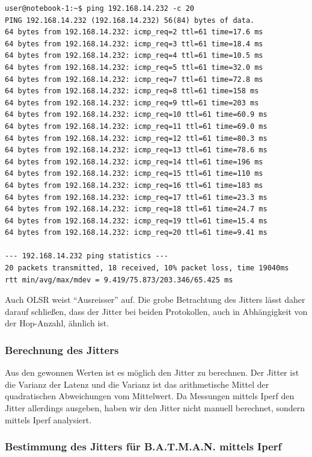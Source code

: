 \documentclass[a4paper,10pt]{article}
\begin{document}
\begin{lstlisting}
user@notebook-1:~$ ping 192.168.14.232 -c 20
PING 192.168.14.232 (192.168.14.232) 56(84) bytes of data.
64 bytes from 192.168.14.232: icmp_req=2 ttl=61 time=17.6 ms
64 bytes from 192.168.14.232: icmp_req=3 ttl=61 time=18.4 ms
64 bytes from 192.168.14.232: icmp_req=4 ttl=61 time=10.5 ms
64 bytes from 192.168.14.232: icmp_req=5 ttl=61 time=32.0 ms
64 bytes from 192.168.14.232: icmp_req=7 ttl=61 time=72.8 ms
64 bytes from 192.168.14.232: icmp_req=8 ttl=61 time=158 ms
64 bytes from 192.168.14.232: icmp_req=9 ttl=61 time=203 ms
64 bytes from 192.168.14.232: icmp_req=10 ttl=61 time=60.9 ms
64 bytes from 192.168.14.232: icmp_req=11 ttl=61 time=69.0 ms
64 bytes from 192.168.14.232: icmp_req=12 ttl=61 time=80.3 ms
64 bytes from 192.168.14.232: icmp_req=13 ttl=61 time=78.6 ms
64 bytes from 192.168.14.232: icmp_req=14 ttl=61 time=196 ms
64 bytes from 192.168.14.232: icmp_req=15 ttl=61 time=110 ms
64 bytes from 192.168.14.232: icmp_req=16 ttl=61 time=183 ms
64 bytes from 192.168.14.232: icmp_req=17 ttl=61 time=23.3 ms
64 bytes from 192.168.14.232: icmp_req=18 ttl=61 time=24.7 ms
64 bytes from 192.168.14.232: icmp_req=19 ttl=61 time=15.4 ms
64 bytes from 192.168.14.232: icmp_req=20 ttl=61 time=9.41 ms

--- 192.168.14.232 ping statistics --- 
20 packets transmitted, 18 received, 10% packet loss, time 19040ms
rtt min/avg/max/mdev = 9.419/75.873/203.346/65.425 ms
\end{lstlisting}

Auch OLSR weist "`Ausreisser"' auf.
Die grobe Betrachtung des Jitters lässt daher darauf schließen, dass der Jitter bei beiden Protokollen, auch in Abhängigkeit von der Hop-Anzahl, ähnlich ist.

\subsubsection*{Berechnung des Jitters}

Aus den gewonnen Werten ist es möglich den Jitter zu berechnen.
Der Jitter ist die Varianz der Latenz und die Varianz ist das arithmetische Mittel der quadratischen Abweichungen vom Mittelwert.
Da Messungen mittels Iperf den Jitter allerdings ausgeben, haben wir den Jitter nicht manuell berechnet, sondern mittels Iperf analysiert.

\subsubsection{Bestimmung des Jitters für B.A.T.M.A.N. mittels Iperf}
\end{document}
